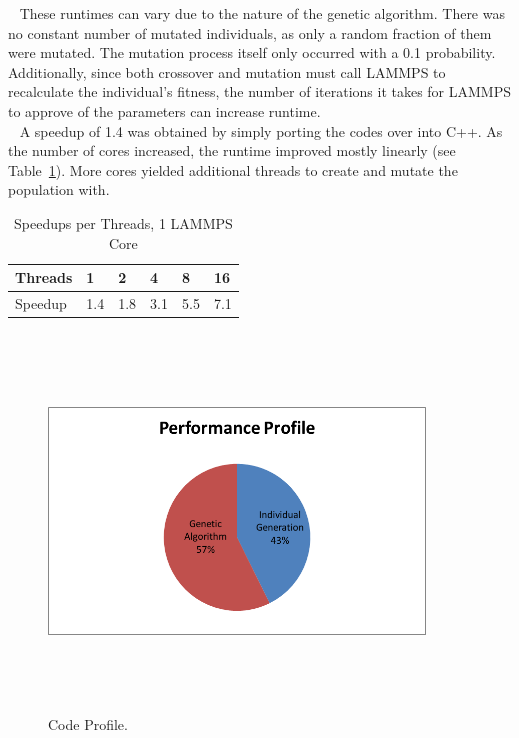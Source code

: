 \documentclass[letterpaper, 12pt]{article}
\begin{document}
\begin{flushleft}
~\newline
These runtimes can vary due to the nature of the genetic algorithm.  There was no constant number of mutated individuals, as only a random fraction of them were mutated.  The mutation process itself only occurred with a 0.1 probability.  Additionally, since both crossover and mutation must call LAMMPS to recalculate the individual's fitness, the number of iterations it takes for LAMMPS to approve of the parameters can increase runtime. \\

~\newline
A speedup of 1.4 was obtained by simply porting the codes over into C++.  As the number of cores increased, the runtime improved mostly linearly (see Table~\ref{speedups1core}).  More cores yielded additional threads to create and mutate the population with.  

\begin{table}[ht]
	\centering
	\caption{Speedups per Threads, 1 LAMMPS Core}
	\label{speedups1core}
	\begin{tabular}{|l|l|l|l|l|l|}
		\hline
		Threads           	& 1  & 2 & 4 & 8 & 16					\\
		\hline
		Speedup 			& 1.4 & 1.8 & 3.1 & 5.5 & 7.1			\\ 
		\hline
	\end{tabular}
\end{table}

\begin{figure}[H]
	\centering
	\includegraphics[width=10cm,height=10cm,keepaspectratio]{profile.png}
	\caption[Profiling]{Code Profile.}
	\label{fig:codeprofile}
\end{figure}


\end{flushleft}
\end{document}
